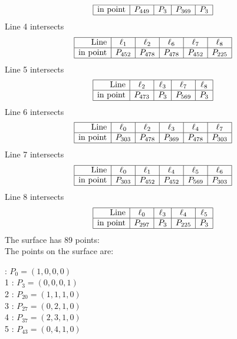 \documentclass{article}
\begin{document}
{$$\begin{array}{|r*{4}{|c}|}
\hline
\mbox{in point}  & P_{449} & P_{3} & P_{369} & P_{3}\\
\hline
\end{array}
$$
Line 4 intersects 
$$
\begin{array}{|r*{5}{|c}|}
\hline
\mbox{Line}  & \ell_{1} & \ell_{2} & \ell_{6} & \ell_{7} & \ell_{8}\\
\hline
\mbox{in point}  & P_{452} & P_{478} & P_{478} & P_{452} & P_{225}\\
\hline
\end{array}
$$
Line 5 intersects 
$$
\begin{array}{|r*{4}{|c}|}
\hline
\mbox{Line}  & \ell_{2} & \ell_{3} & \ell_{7} & \ell_{8}\\
\hline
\mbox{in point}  & P_{473} & P_{3} & P_{569} & P_{3}\\
\hline
\end{array}
$$
Line 6 intersects 
$$
\begin{array}{|r*{5}{|c}|}
\hline
\mbox{Line}  & \ell_{0} & \ell_{2} & \ell_{3} & \ell_{4} & \ell_{7}\\
\hline
\mbox{in point}  & P_{303} & P_{478} & P_{369} & P_{478} & P_{303}\\
\hline
\end{array}
$$
Line 7 intersects 
$$
\begin{array}{|r*{5}{|c}|}
\hline
\mbox{Line}  & \ell_{0} & \ell_{1} & \ell_{4} & \ell_{5} & \ell_{6}\\
\hline
\mbox{in point}  & P_{303} & P_{452} & P_{452} & P_{569} & P_{303}\\
\hline
\end{array}
$$
Line 8 intersects 
$$
\begin{array}{|r*{4}{|c}|}
\hline
\mbox{Line}  & \ell_{0} & \ell_{3} & \ell_{4} & \ell_{5}\\
\hline
\mbox{in point}  & P_{297} & P_{3} & P_{225} & P_{3}\\
\hline
\end{array}
$$
The surface has 89 points:\\
The points on the surface are:\\
\begin{multicols}{3}
 : $P_{0}=( 1, 0, 0, 0 )$\\
1 : $P_{3}=( 0, 0, 0, 1 )$\\
2 : $P_{20}=( 1, 1, 1, 0 )$\\
3 : $P_{27}=( 0, 2, 1, 0 )$\\
4 : $P_{37}=( 2, 3, 1, 0 )$\\
5 : $P_{43}=( 0, 4, 1, 0 )$\\

\end{multicols}}
\end{document}
